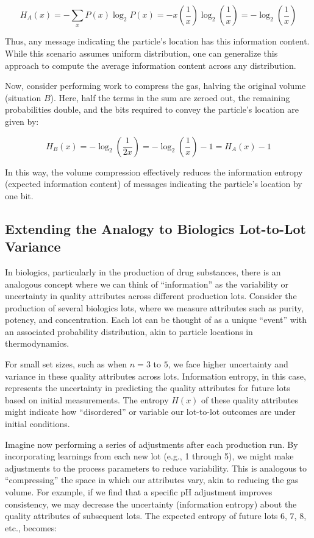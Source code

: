 \documentclass[
  12 pt,
  a4paper,
]{book}
\numberwithin{equation}{section}
\theoremstyle{plain}      %
\theoremstyle{definition} %
\theoremstyle{remark}     %
\theoremstyle{note}         %
\begin{document}
\[
H_A(x)=-\sum_x P(x) \log _2 P(x)=-x\left(\frac{1}{x}\right) \log _2\left(\frac{1}{x}\right)=-\log _2\left(\frac{1}{x}\right)
\]

Thus, any message indicating the particle's location has this
information content. While this scenario assumes uniform distribution,
one can generalize this approach to compute the average information
content across any distribution.

Now, consider performing work to compress the gas, halving the original
volume (situation \(B\)). Here, half the terms in the sum are zeroed
out, the remaining probabilities double, and the bits required to convey
the particle's location are given by:

\[
H_B(x)=-\log _2\left(\frac{1}{2 x}\right)=-\log _2\left(\frac{1}{x}\right)-1=H_A(x)-1
\]

In this way, the volume compression effectively reduces the information
entropy (expected information content) of messages indicating the
particle's location by one bit.

\hypertarget{extending-the-analogy-to-biologics-lot-to-lot-variance}{%
\subsection{Extending the Analogy to Biologics Lot-to-Lot
Variance}\label{extending-the-analogy-to-biologics-lot-to-lot-variance}}

In biologics, particularly in the production of drug substances, there
is an analogous concept where we can think of ``information'' as the
variability or uncertainty in quality attributes across different
production lots. Consider the production of several biologics lots,
where we measure attributes such as purity, potency, and concentration.
Each lot can be thought of as a unique ``event'' with an associated
probability distribution, akin to particle locations in thermodynamics.

For small set sizes, such as when \(n = 3\) to \(5\), we face higher
uncertainty and variance in these quality attributes across lots.
Information entropy, in this case, represents the uncertainty in
predicting the quality attributes for future lots based on initial
measurements. The entropy \(H(x)\) of these quality attributes might
indicate how ``disordered'' or variable our lot-to-lot outcomes are
under initial conditions.

Imagine now performing a series of adjustments after each production
run. By incorporating learnings from each new lot (e.g., 1 through 5),
we might make adjustments to the process parameters to reduce
variability. This is analogous to ``compressing'' the space in which our
attributes vary, akin to reducing the gas volume. For example, if we
find that a specific pH adjustment improves consistency, we may decrease
the uncertainty (information entropy) about the quality attributes of
subsequent lots. The expected entropy of future lots \(6\), \(7\),
\(8\), etc., becomes:
\end{document}
